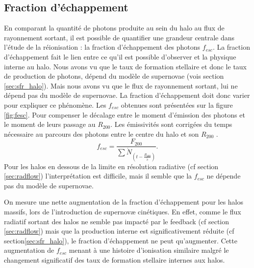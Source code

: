\subsection{Fraction d'échappement}
\label{sec:fesc}

En comparant la quantité de photons produite au sein du halo au flux de rayonnement sortant, il est possible de quantifier une grandeur centrale dans l'étude de la réionisation : la fraction d'échappement des photons $f_{esc}$.
La fraction d'échappement fait le lien entre ce qu'il est possible d'observer et la physique interne au halo.
Nous avons vu que le taux de formation stellaire et donc le taux de production de photons, dépend du modèle de supernovae (vois section \ref{sec:sfr_halo}).
Mais nous avons vu que le flux de rayonnement sortant, lui ne dépend pas du modèle de supernovae.
La fraction d'échappement doit donc varier pour expliquer ce phénomène.
Les $f_{esc}$ obtenues sont présentées sur la figure \ref{fig:fesc}.
Pour compenser le décalage entre le moment d’émission des photons et le moment de leurs passage au $R_{200}$.
Les émissivités sont corrigées du temps nécessaire au parcours des photons entre le centre du halo et son $R_{200}$ \citep{kimm_feedback-regulated_2017}.
\begin{equation}
f_{esc} = \frac{ F_{200}} {\sum \dot{N}_{\left( t-\frac{R_{200}}{\tilde{c} } \right) } }.
\end{equation}
Pour les halos en dessous de la limite en résolution radiative (cf section \ref{sec:radflow}) l'interprétation est difficile, mais il semble que la $f_{esc}$ ne dépende pas du modèle de supernovae.

On mesure une nette augmentation de la fraction d'échappement pour les halos massifs, lors de l'introduction de supernovæ cinétiques.
En effet, comme le flux radiatif sortant des halos ne semble pas impacté par le feedback (cf section \ref{sec:radflow}) mais que la production interne est significativement réduite (cf section\ref{sec:sfr_halo}), le fraction d'échappement ne peut qu'augmenter.
Cette augmentation de $f_{esc}$ menant à une histoire d'ionisation similaire malgré le changement significatif des taux de formation stellaire internes aux halos.

